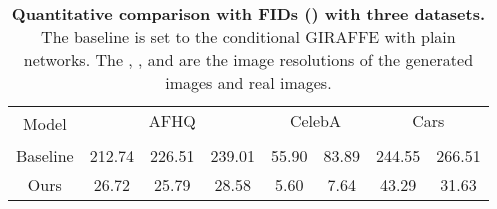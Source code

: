 \documentclass[nohyperref]{article}
\theoremstyle{plain}
\theoremstyle{definition}
\theoremstyle{remark}
\begin{document}
\begin{table}[h!]
\caption{\textbf{Quantitative comparison with FIDs () with three datasets.} The baseline is set to the conditional GIRAFFE with plain networks. The , , and  are the image resolutions of the generated images and real images.}
\label{table_1}
\vskip 0.15in
\begin{center}
\begin{small}
\begin{sc}
\resizebox{\columnwidth}{!}
{
\begin{tabular}{c|ccc|cc|cc}
\hline\hline
\multirow{2}{*}{Model} & \multicolumn{3}{c|}{AFHQ} & \multicolumn{2}{c|}{CelebA} & \multicolumn{2}{c}{Cars}\\
\cline{2-8}
      &  &  &  &  &  &  &  \\
\hline
 Baseline & 212.74 & 226.51 & 239.01 & 55.90 & 83.89 & 244.55 & 266.51 \\
 Ours & 26.72 & 25.79 & 28.58 & 5.60 & 7.64 &43.29 & 31.63 \\
 
\hline
\hline
\end{tabular}}
\end{sc}
\end{small}
\end{center}
\vskip -0.1in
\end{table}
\end{document}
